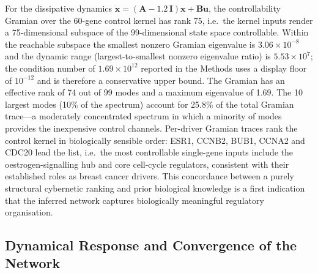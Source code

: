 \documentclass[12pt]{article}
\begin{document}
For the dissipative dynamics $\dot{\mathbf{x}} = (\mathbf{A} -
1.2\,\mathbf{I})\mathbf{x} + \mathbf{B}\mathbf{u}$, the controllability
Gramian over the 60-gene control kernel has rank 75, i.e.\ the kernel inputs
render a 75-dimensional subspace of the 99-dimensional state space
controllable. Within the reachable subspace the smallest nonzero Gramian
eigenvalue is $3.06\times10^{-8}$ and the dynamic range
(largest-to-smallest nonzero eigenvalue ratio) is $5.53\times10^{7}$;
the condition number of $1.69\times10^{12}$ reported in the Methods uses a
display floor of $10^{-12}$ and is therefore a conservative upper bound.
The Gramian has an effective rank of 74 out of 99 modes and a maximum
eigenvalue of 1.69. The 10 largest modes (10\% of the spectrum) account for
25.8\% of the total Gramian trace---a moderately concentrated spectrum in
which a minority of modes provides the inexpensive control channels. Per-driver Gramian traces rank the control
kernel in biologically sensible order: ESR1, CCNB2, BUB1, CCNA2 and CDC20
lead the list, i.e.\ the most controllable single-gene inputs
include the oestrogen-signalling hub and core cell-cycle regulators,
consistent with their established roles as breast cancer drivers. This
concordance between a purely structural cybernetic ranking and prior
biological knowledge is a first indication that the inferred network
captures biologically meaningful regulatory organisation.

\subsection{Dynamical Response and Convergence of the Network}
\end{document}
